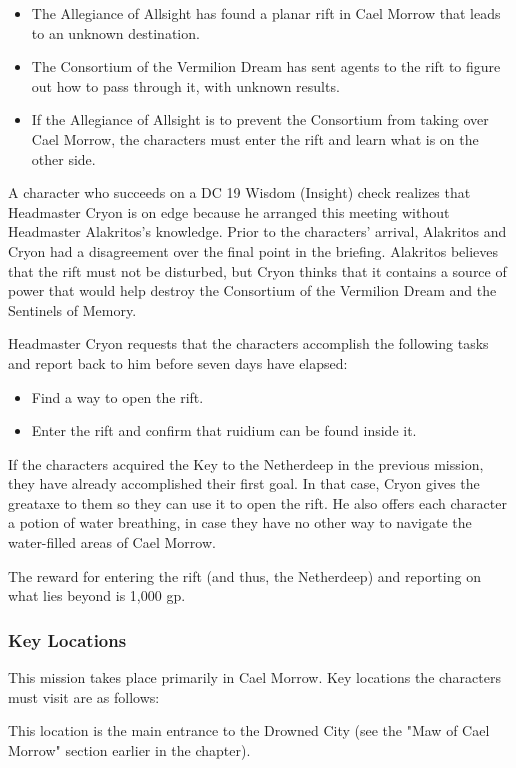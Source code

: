 \documentclass[10pt,a4paper,twoside,twocolumn,openany,nodeprecatedcode]{dndbook}
\begin{document}
\begin{itemize}
\item The Allegiance of Allsight has found a planar rift in Cael Morrow that leads to an unknown destination.
\item The Consortium of the Vermilion Dream has sent agents to the rift to figure out how to pass through it, with unknown results.
\item If the Allegiance of Allsight is to prevent the Consortium from taking over Cael Morrow, the characters must enter the rift and learn what is on the other side.
\end{itemize}

A character who succeeds on a DC 19 Wisdom (Insight) check realizes that Headmaster Cryon is on edge because he arranged this meeting without Headmaster Alakritos's knowledge. Prior to the characters' arrival, Alakritos and Cryon had a disagreement over the final point in the briefing. Alakritos believes that the rift must not be disturbed, but Cryon thinks that it contains a source of power that would help destroy the Consortium of the Vermilion Dream and the Sentinels of Memory.

Headmaster Cryon requests that the characters accomplish the following tasks and report back to him before seven days have elapsed:


\begin{itemize}
\item Find a way to open the rift.
\item Enter the rift and confirm that ruidium can be found inside it.
\end{itemize}

If the characters acquired the Key to the Netherdeep in the previous mission, they have already accomplished their first goal. In that case, Cryon gives the greataxe to them so they can use it to open the rift. He also offers each character a potion of water breathing, in case they have no other way to navigate the water-filled areas of Cael Morrow.

The reward for entering the rift (and thus, the Netherdeep) and reporting on what lies beyond is 1,000 gp.

\subsubsection{Key Locations}
This mission takes place primarily in Cael Morrow. Key locations the characters must visit are as follows:


\begin{description}[nolistsep]
\item[Maw of Cael Morrow.]
This location is the main entrance to the Drowned City (see the "Maw of Cael Morrow" section earlier in the chapter).
\end{description}
\end{document}
